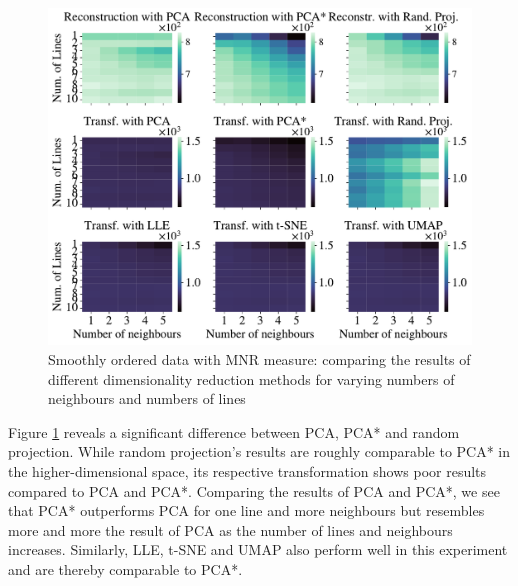 \documentclass[pdftex,12pt,a4paper]{report}
\begin{document}
\begin{figure}[htb!]
    \includegraphics[width=\textwidth]{./images/multiple_runs/one_line/num_lines_vs_num_neigh/multiple_scalar_product/all_methods_10runs_10lines_100points_5neighbours.pdf}
    \caption{Smoothly ordered data with MNR measure: comparing the results of different dimensionality reduction methods for varying numbers of neighbours and numbers of lines}\label{fig:num_neigh_vs_num_lines_oneline_scal}
\end{figure}

Figure \ref{fig:num_neigh_vs_num_lines_oneline_scal} reveals a significant difference between PCA, PCA* and random projection.
While random projection's results are roughly comparable to PCA* in the higher-dimensional space, its respective transformation shows poor results compared to PCA and PCA*.
Comparing the results of PCA and PCA*, we see that PCA* outperforms PCA for one line and more neighbours but resembles more and more the result of PCA as the number of lines and neighbours increases.
Similarly, LLE, t-SNE and UMAP also perform well in this experiment and are thereby comparable to PCA*.
\end{document}
